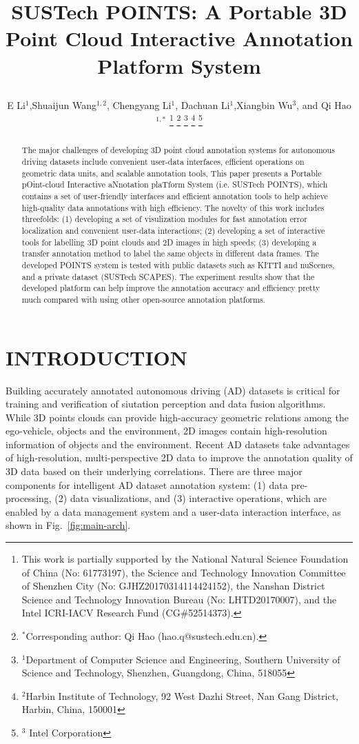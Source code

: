 \documentclass[letterpaper, 10 pt, conference]{ieeeconf}  %
\title{\LARGE \bf
SUSTech POINTS: A Portable 3D Point Cloud Interactive Annotation Platform System

}
\author{E Li$^{1}$,Shuaijun Wang$^{1,2}$,  Chengyang Li$^{1}$, Dachuan Li$^{1}$,Xiangbin Wu$^{3}$, and Qi Hao$^{1,*}$%
\thanks{This work is partially supported by the National Natural Science Foundation of China (No: 61773197), the Science and Technology Innovation Committee of Shenzhen City (No: GJHZ20170314114424152), the Nanshan District Science and Technology Innovation Bureau (No: LHTD20170007), and the Intel ICRI-IACV Research Fund (CG$\#$52514373).}
\thanks{$^{*}$Corresponding author: Qi Hao (hao.q@sustech.edu.cn).}
\thanks{$^{1}$Department of Computer Science and Engineering,
Southern University of Science and Technology, Shenzhen, Guangdong, China, 518055}
\thanks{$^{2}$Harbin Institute of Technology,
92 West Dazhi Street, Nan Gang District, Harbin, China, 150001}%
\thanks{$^{3}$ Intel Corporation}%
}
\begin{document}
\maketitle
\thispagestyle{empty}
\pagestyle{empty}
\begin{abstract}


The major challenges of developing 3D point cloud annotation systems for autonomous driving datasets include convenient user-data interfaces, efficient operations on geometric data units,  and scalable annotation tools, This paper presents a Portable pOint-cloud Interactive aNnotation plaTform System (i.e. SUSTech POINTS), which contains a set of user-friendly interfaces and efficient annotation tools to help achieve high-quality data annotations with high efficiency. 
The novelty of this work includes threefolds: 
(1) developing a set of visulization modules for fast annotation error localization and convenient user-data interactions; 
(2) developing a set of interactive tools for labelling 3D point clouds and 2D images in high speeds;
(3) developing a transfer annotation method to label the same objects in different data frames. 
The developed POINTS system is tested with public datasets such as KITTI and nuScenes, and a private dataset (SUSTech SCAPES). 
The experiment results show that the developed platform can help improve the annotation accuracy and efficiency pretty much compared with using other open-source annotation platforms.


\end{abstract}






\section{INTRODUCTION}

Building accurately annotated autonomous driving (AD) datasets is critical for training and verification of siutation perception and data fusion algorithms. While 3D points clouds can provide high-accuracy geometric relations among the ego-vehicle, objects and the environment, 2D images contain high-resolution information of objects and the environment. Recent AD datasets take advantages of high-resolution, multi-perspective 2D data to improve the annotation quality of 3D data based on their underlying correlations. There are three major components for intelligent AD dataset annotation system: (1) data pre-processing, (2) data visualizations, and (3) interactive operations, which are enabled by a data management system and a user-data interaction interface, as shown in Fig.~\ref{fig:main-arch}. 
\end{document}
